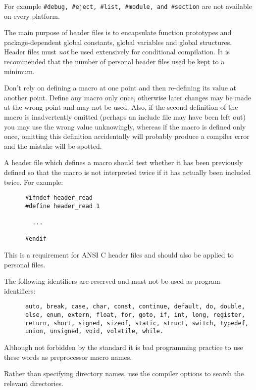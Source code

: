 \newpage
{}
For example \verb~#debug, #eject, #list, #module, and #section~
are not available on every platform.

The main purpose of header files is to encapsulate function prototypes 
and package-dependent global constants, global variables and global structures.
Header files must {\sl not\/} be used extensively for conditional
compilation.  It is recommended that the number of personal header files used  
be kept to a minimum.

Don't rely on defining a macro at one point and then re-defining its
value at another point. Define any macro only once, otherwise later changes may
be made at the wrong point and may not be used. Also, if the second
definition of the macro is inadvertently omitted (perhaps an include 
file may have been left out) you 
may use the wrong value unknowingly, 
whereas if the macro is defined
only once, omitting this definition accidentally will probably produce 
a compiler error and the mistake will be spotted. 


A header file which defines a macro  should test whether it has been
previously defined  so that the macro is
not interpreted twice if it has actually been included twice. For example:
\begin{verbatim}
      #ifndef header_read
      #define header_read 1

        ...

      #endif
\end{verbatim}
This is a requirement for ANSI C header files and should also be applied to 
personal files.

The following identifiers are reserved and must not be used as program 
identifiers:
\begin{verbatim}
      auto, break, case, char, const, continue, default, do, double, 
      else, enum, extern, float, for, goto, if, int, long, register,
      return, short, signed, sizeof, static, struct, switch, typedef, 
      union, unsigned, void, volatile, while.
\end{verbatim}
Although  not forbidden by the standard it is bad programming practice
to use these words as preprocessor macro names.


Rather than specifying directory names, use the
compiler options to search the relevant directories.

